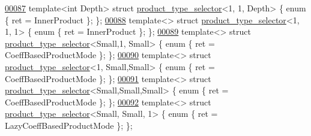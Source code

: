 \begin{DoxyCode}
\hyperlink{struct_eigen_1_1internal_1_1product__type__selector_3_011_00_011_00_01_depth_01_4}{00087} \textcolor{keyword}{template}<\textcolor{keywordtype}{int} Depth>     \textcolor{keyword}{struct }\hyperlink{struct_eigen_1_1internal_1_1product__type__selector}{product\_type\_selector}<1,    1,    Depth>  \{ \textcolor{keyword}{enum} \{ ret 
      = InnerProduct \}; \};
\hyperlink{struct_eigen_1_1internal_1_1product__type__selector_3_011_00_011_00_011_01_4}{00088} \textcolor{keyword}{template}<>              \textcolor{keyword}{struct }\hyperlink{struct_eigen_1_1internal_1_1product__type__selector}{product\_type\_selector}<1,    1,    1>      \{ \textcolor{keyword}{enum} \{ ret 
      = InnerProduct \}; \};
\hyperlink{struct_eigen_1_1internal_1_1product__type__selector_3_01_small_00_011_00_01_small_01_4}{00089} \textcolor{keyword}{template}<>              \textcolor{keyword}{struct }\hyperlink{struct_eigen_1_1internal_1_1product__type__selector}{product\_type\_selector}<Small,1,    Small>  \{ \textcolor{keyword}{enum} \{ ret 
      = CoeffBasedProductMode \}; \};
\hyperlink{struct_eigen_1_1internal_1_1product__type__selector_3_011_00_01_small_00_01_small_01_4}{00090} \textcolor{keyword}{template}<>              \textcolor{keyword}{struct }\hyperlink{struct_eigen_1_1internal_1_1product__type__selector}{product\_type\_selector}<1,    Small,Small>  \{ \textcolor{keyword}{enum} \{ ret 
      = CoeffBasedProductMode \}; \};
\hyperlink{struct_eigen_1_1internal_1_1product__type__selector_3_01_small_00_01_small_00_01_small_01_4}{00091} \textcolor{keyword}{template}<>              \textcolor{keyword}{struct }\hyperlink{struct_eigen_1_1internal_1_1product__type__selector}{product\_type\_selector}<Small,Small,Small>  \{ \textcolor{keyword}{enum} \{ ret 
      = CoeffBasedProductMode \}; \};
\hyperlink{struct_eigen_1_1internal_1_1product__type__selector_3_01_small_00_01_small_00_011_01_4}{00092} \textcolor{keyword}{template}<>              \textcolor{keyword}{struct }\hyperlink{struct_eigen_1_1internal_1_1product__type__selector}{product\_type\_selector}<Small, Small, 1>    \{ \textcolor{keyword}{enum} \{ ret 
      = LazyCoeffBasedProductMode \}; \};

\end{DoxyCode}
